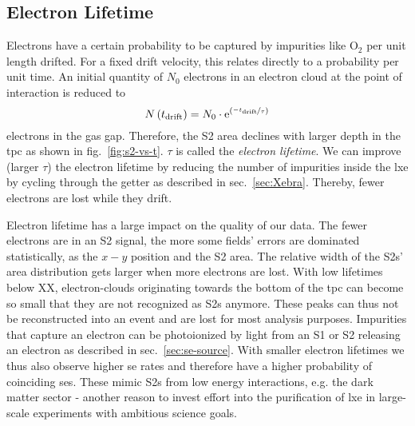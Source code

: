 
\FloatBarrier
\subsection{Electron Lifetime}
\label{ssec:e-lifetime}
\FloatBarrier


Electrons have a certain probability to be captured by impurities like $ \mathrm{O}_2 $ per unit length drifted.
For a fixed drift velocity, this relates directly to a probability per unit time.
An initial quantity of $ N_0 $ electrons in an electron cloud at the point of interaction is reduced to
\begin{equation}
    N \left( t_\mathrm{drift} \right) = N_0 \cdot \mathrm{e}^{ \left( \nicefrac{-t_\mathrm{drift}}{\tau} \right)}
    \label{eq:e-lifetime}
\end{equation}
electrons in the gas gap.
Therefore, the S2 area declines with larger depth in the \gls{tpc} as shown in fig.~\ref{fig:s2-vs-t}.
$ \tau $ is called the \emph{electron lifetime}.
We can improve (larger $ \tau $) the electron lifetime by reducing the number of impurities inside the \gls{lxe} by cycling through the getter as described in sec.~\ref{sec:Xebra}. %
Thereby, fewer electrons are lost while they drift.

Electron lifetime has a large impact on the quality of our data.
The fewer electrons are in an S2 signal, the more some fields' errors are dominated statistically, as the $ x-y$ position and the S2 area.
The relative width of the S2s' area distribution gets larger when more electrons are lost.
With low lifetimes below XX, electron-clouds originating towards the bottom of the \gls{tpc} can become so small that they are not recognized as S2s anymore.  %
These peaks can thus not be reconstructed into an event and are lost for most analysis purposes.
Impurities that capture an electron can be photoionized by light from an S1 or S2 releasing an electron as described in sec.~\ref{sec:se-source}.  %
With smaller electron lifetimes we thus also observe higher \gls{se} rates and therefore have a higher probability of coinciding \glspl{se}.
These mimic S2s from low energy interactions, e.g. the dark matter sector - another reason to invest effort into the purification of \gls{lxe} in large-scale experiments with ambitious science goals.

